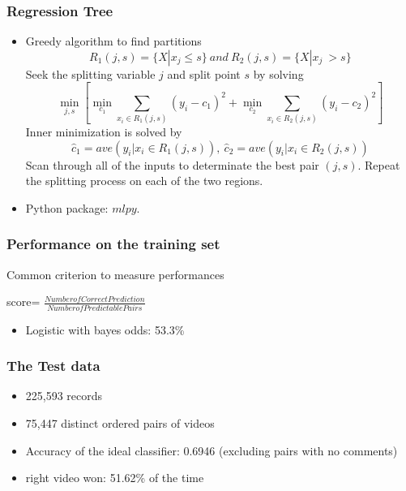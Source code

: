 \documentclass[fleqn]{beamer}
\begin{document}
\begin{frame}
\frametitle{Regression Tree}
  \begin{itemize}
   \item Greedy algorithm to find partitions
   $$R_1(j, s) = \{X|x_j \leq s\}\ and\ R_2(j, s) = \{X|x_j \ > s\}$$
   Seek the splitting variable $j$ and split point $s$ by solving
   $$\min_{j,s} [\min_{c_1} \sum_{x_i \in R_1(j, s)} (y_i - c_1)^2 + \min_{c_2} \sum_{x_i \in R_2(j, s)} (y_i - c_2)^2]$$
   Inner minimization is solved by
   $$\hat{c}_1 = ave(y_i| x_i \in R_1(j,s)),\ \hat{c}_2 = ave(y_i|x_i \in R_2(j,s))$$
   Scan through all of the inputs to determinate the best pair $(j, s)$. Repeat the splitting process on each of the two regions.
  \item Python package: $mlpy$.
  \end{itemize}

\end{frame}

\begin{frame}
\frametitle{Performance on the training set}

    \begin{beamerboxesrounded}{Common criterion to measure performances}

     score= $\frac{Number of Correct Prediction}{Number of Predictable Pairs}$
     \end{beamerboxesrounded}
    \begin{itemize}
          \item Logistic with bayes odds: 53.3\%
    \end{itemize}
\end{frame}

\begin{frame}
\frametitle{The Test data}
    \begin{itemize}
        \item 225,593 records
        \item 75,447 distinct ordered pairs of videos
        \item Accuracy of the ideal classifier: 0.6946 (excluding pairs with no comments)
        \item right video won: 51.62\% of the time
    \end{itemize}

\end{frame}
\end{document}

